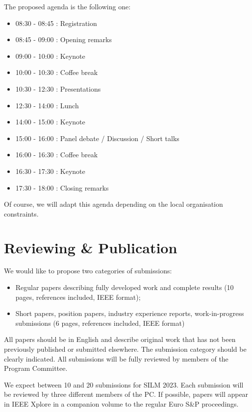 \documentclass[a4paper,11pt]{article}
\newcommand{\SILMYear}{2023}
\begin{document}
The proposed agenda is the following one:
%
\begin{itemize}
    \item 08:30 - 08:45 : Registration
    \item 08:45 - 09:00 : Opening remarks
    \item 09:00 - 10:00 : Keynote
    \item 10:00 - 10:30 : Coffee break
    \item 10:30 - 12:30 : Presentations
    \item 12:30 - 14:00 : Lunch
    \item 14:00 - 15:00 : Keynote
    \item 15:00 - 16:00 : Panel debate / Discussion / Short talks
    \item 16:00 - 16:30 : Coffee break
    \item 16:30 - 17:30 : Keynote
    \item 17:30 - 18:00 : Closing remarks
\end{itemize}
%
Of course, we will adapt this agenda depending on the local organisation constraints.


\section{Reviewing \& Publication}
%
We would like to propose two categories of submissions:
%
\begin{itemize}
%
    \item Regular papers describing fully developed work and complete
results (10 pages, references included, IEEE format);
%
    \item Short papers, position papers, industry experience reports,
work-in-progress submissions (6 pages, references included, IEEE format)
%
\end{itemize}

All papers should be in English and describe original work that has not
been previously published or submitted elsewhere. The submission category
should be clearly indicated. All submissions will be fully reviewed by
members of the Program Committee.

We expect between 10 and 20 submissions for SILM \SILMYear{}. Each
submission will be reviewed by three different members of the PC.  If
possible, papers will appear in IEEE Xplore in a companion volume to the
regular Euro S\&P proceedings.
\end{document}
